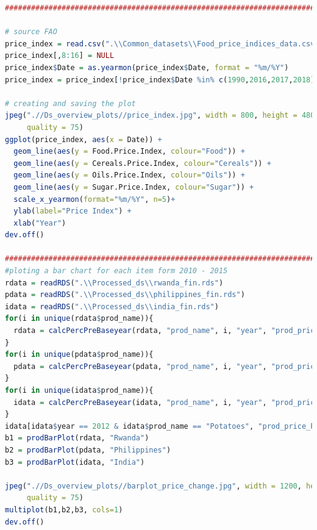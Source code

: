 \documentclass[11pt]{article}
\begin{document}
\begin{lstlisting}[language= R]
#####################################################################################################

# source FAO
price_index = read.csv(".\\Common_datasets\\Food_price_indices_data.csv", stringsAsFactors = FALSE, sep = ",")
price_index[,8:16] = NULL
price_index$Date = as.yearmon(price_index$Date, format = "%m/%Y")
price_index = price_index[!price_index$Date %in% c(1990,2016,2017,2018),]

# creating and saving the plot
jpeg(".//Ds_overview_plots//price_index.jpg", width = 800, height = 480, units = "px", pointsize = 12,
     quality = 75)
ggplot(price_index, aes(x = Date)) +
  geom_line(aes(y = Food.Price.Index, colour="Food")) +
  geom_line(aes(y = Cereals.Price.Index, colour="Cereals")) +
  geom_line(aes(y = Oils.Price.Index, colour="Oils")) +
  geom_line(aes(y = Sugar.Price.Index, colour="Sugar")) +
  scale_x_yearmon(format="%m/%Y", n=5)+
  ylab(label="Price Index") +
  xlab("Year")
dev.off()

#######################################################################################################
#ploting a bar chart for each item form 2010 - 2015
rdata = readRDS(".\\Processed_ds\\rwanda_fin.rds")
pdata = readRDS(".\\Processed_ds\\philippines_fin.rds")
idata = readRDS(".\\Processed_ds\\india_fin.rds")
for(i in unique(rdata$prod_name)){
  rdata = calcPercPreBaseyear(rdata, "prod_name", i, "year", "prod_price")
}
for(i in unique(pdata$prod_name)){
  pdata = calcPercPreBaseyear(pdata, "prod_name", i, "year", "prod_price")
}
for(i in unique(idata$prod_name)){
  idata = calcPercPreBaseyear(idata, "prod_name", i, "year", "prod_price")
}
idata[idata$year == 2012 & idata$prod_name == "Potatoes", "prod_price_Percent"] = 0
b1 = prodBarPlot(rdata, "Rwanda")
b2 = prodBarPlot(pdata, "Philippines")
b3 = prodBarPlot(idata, "India")

jpeg(".//Ds_overview_plots//barplot_price_change.jpg", width = 1200, height = 800, units = "px", pointsize = 12,
     quality = 75)
multiplot(b1,b2,b3, cols=1)
dev.off()

\end{lstlisting}
\end{document}

